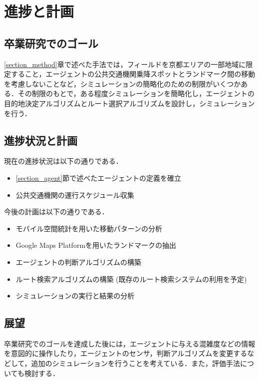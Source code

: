 \section{進捗と計画}
\subsection{卒業研究でのゴール}
\ref{section_method}章で述べた手法では，フィールドを京都エリアの一部地域に限定すること，エージェントの公共交通機関乗降スポットとランドマーク間の移動を考慮しないことなど，シミュレーションの簡略化のための制限がいくつかある．その制限のもとで，ある程度シミュレーションを簡略化し，エージェントの目的地決定アルゴリズムとルート選択アルゴリズムを設計し，シミュレーションを行う．

\subsection{進捗状況と計画}
現在の進捗状況は以下の通りである．
\begin{itemize}
  \item \ref{section_agent}節で述べたエージェントの定義を確立
  \item 公共交通機関の運行スケジュール収集
\end{itemize}

今後の計画は以下の通りである．
\begin{itemize}
  \item モバイル空間統計を用いた移動パターンの分析
  \item Google Maps Platformを用いたランドマークの抽出
  \item エージェントの判断アルゴリズムの構築
  \item ルート検索アルゴリズムの構築 (既存のルート検索システムの利用を予定)
  \item シミュレーションの実行と結果の分析
\end{itemize}

\subsection{展望}
卒業研究でのゴールを達成した後には，エージェントに与える混雑度などの情報を意図的に操作したり，エージェントのセンサ，判断アルゴリズムを変更するなどして，追加のシミュレーションを行うことを考えている．また，評価手法についても検討する．
